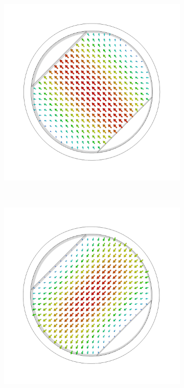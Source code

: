 \documentclass[14pt,a4paper]{ntust_report}
\begin{document}
\begin{figure}
\begin{subfigure}{.45\textwidth}
        \caption{\label{fig:square-polarizer-mode2}}
    \end{subfigure}
    \\
    \begin{subfigure}{.45\textwidth}
        \centering
        \includegraphics[width=\textwidth]{src/polarizer_circular_mode1.png}
        \caption{\label{fig:circular-polarizer-mode1}}
    \end{subfigure}
    ~
    \begin{subfigure}{.45\textwidth}
        \centering
        \includegraphics[width=\textwidth]{src/polarizer_circular_mode2.png}

\end{subfigure}
\end{figure}
\end{document}
